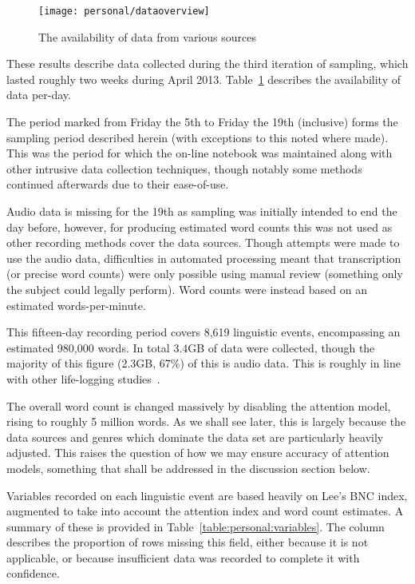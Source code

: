 

\begin{figure}[hp]
    \centering
    \begin{sideways}
        \texttt{[image: personal/dataoverview]}
    \end{sideways}
    \caption{The availability of data from various sources}
    \label{fig:personal:dataoverview}
\end{figure}
\FloatBarrier

These results describe data collected during the third iteration of sampling, which lasted roughly two weeks during April 2013.  Table~\ref{fig:personal:dataoverview} describes the availability of data per-day.

The period marked from Friday the 5th to Friday the 19th (inclusive) forms the sampling period described herein (with exceptions to this noted where made).  This was the period for which the on-line notebook was maintained along with other intrusive data collection techniques, though notably some methods continued afterwards due to their ease-of-use.

Audio data is missing for the 19th as sampling was initially intended to end the day before, however, for producing estimated word counts this was not used as other recording methods cover the data sources.  Though attempts were made to use the audio data, difficulties in automated processing meant that transcription (or precise word counts) were only possible using manual review (something only the subject could legally perform).  Word counts were instead based on an estimated words-per-minute.


This fifteen-day recording period covers 8,619 linguistic events, encompassing an estimated 980,000 words.  In total 3.4GB of data were collected, though the majority of this figure (2.3GB, 67\%) of this is audio data.  This is roughly in line with other life-logging studies~\cite{gemmell2006mylifebits}.

The overall word count is changed massively by disabling the attention model, rising to roughly 5 million words.  As we shall see later, this is largely because the data sources and genres which dominate the data set are particularly heavily adjusted.  This raises the question of how we may ensure accuracy of attention models, something that shall be addressed in the discussion section below.




Variables recorded on each linguistic event are based heavily on Lee's BNC index, augmented to take into account the attention index and word count estimates.  A summary of these is provided in Table~\ref{table:personal:variables}.  The  column describes the proportion of rows missing this field, either because it is not applicable, or because insufficient data was recorded to complete it with confidence.


